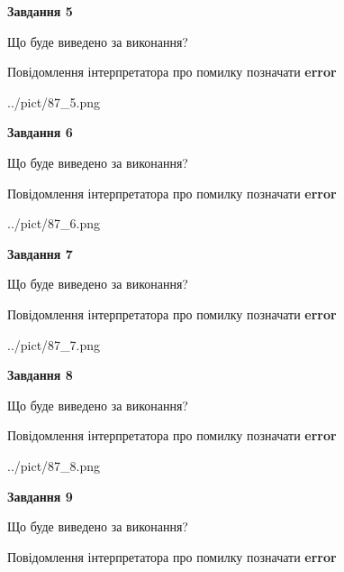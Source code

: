 \documentclass[11pt, ukrainian]{article}
\begin{document}
{\begin {large}
{\begin {center}\textbf{Завдання 5}\end {center}}\par
Що буде виведено за виконання? \par
Повідомлення інтерпретатора про помилку позначати \textbf{error}

\begin{center}
	{../pict/87_5.png}
\end{center}
\newpage

{\begin {center}\textbf{Завдання 6}\end {center}}\par
Що буде виведено за виконання? \par
Повідомлення інтерпретатора про помилку позначати \textbf{error}

\begin{center}
	{../pict/87_6.png}
\end{center}
\newpage

{\begin {center}\textbf{Завдання 7}\end {center}}\par
Що буде виведено за виконання? \par
Повідомлення інтерпретатора про помилку позначати \textbf{error}

\begin{center}
	{../pict/87_7.png}
\end{center}
\newpage

{\begin {center}\textbf{Завдання 8}\end {center}}\par
Що буде виведено за виконання? \par
Повідомлення інтерпретатора про помилку позначати \textbf{error}

\begin{center}
	{../pict/87_8.png}
\end{center}
\newpage

{\begin {center}\textbf{Завдання 9}\end {center}}\par
Що буде виведено за виконання? \par
Повідомлення інтерпретатора про помилку позначати \textbf{error}


\end{large}}
\end{document}

